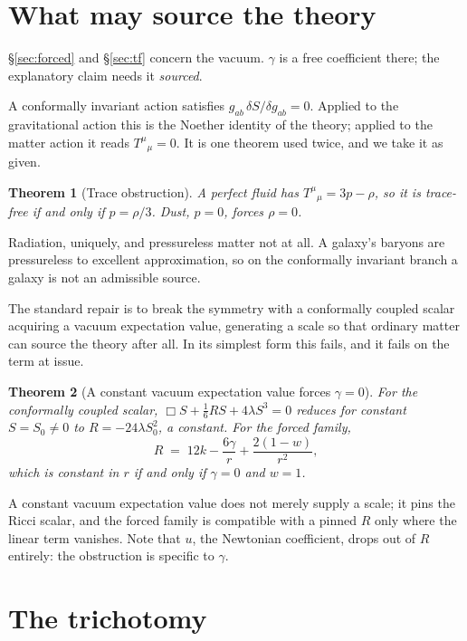 \documentclass[11pt]{article}
\newtheorem{theorem}{Theorem}[section]
\theoremstyle{definition}
\theoremstyle{remark}
\begin{document}
\section{What may source the theory}
\label{sec:matter}

\S\ref{sec:forced} and \S\ref{sec:tf} concern the vacuum.  \(\gamma\) is a
free coefficient there; the explanatory claim needs it \emph{sourced}.

A conformally invariant action satisfies
\(g_{ab}\,\delta S/\delta g_{ab}=0\).  Applied to the gravitational action
this is the Noether identity of the theory; applied to the matter action it
reads \(T^{\mu}{}_{\mu}=0\).  It is one theorem used twice, and we take it as
given.

\begin{theorem}[Trace obstruction]
\label{thm:trace}
A perfect fluid has \(T^{\mu}{}_{\mu}=3p-\rho\), so it is trace-free if and
only if \(p=\rho/3\).  Dust, \(p=0\), forces \(\rho=0\).
\end{theorem}

Radiation, uniquely, and pressureless matter not at all.  A galaxy's baryons
are pressureless to excellent approximation, so on the conformally invariant
branch a galaxy is not an admissible source.

The standard repair is to break the symmetry with a conformally coupled
scalar acquiring a vacuum expectation value, generating a scale so that
ordinary matter can source the theory after all.  In its simplest form this
fails, and it fails on the term at issue.

\begin{theorem}[A constant vacuum expectation value forces \(\gamma=0\)]
\label{thm:vev}
For the conformally coupled scalar, \(\Box S+\tfrac{1}{6}RS+4\lambda S^{3}=0\)
reduces for constant \(S=S_{0}\neq0\) to \(R=-24\lambda S_{0}^{2}\), a
constant.  For the forced family,
\[
  R \;=\; 12k-\frac{6\gamma}{r}+\frac{2(1-w)}{r^{2}},
\]
which is constant in \(r\) if and only if \(\gamma=0\) and \(w=1\).
\end{theorem}

A constant vacuum expectation value does not merely supply a scale; it pins
the Ricci scalar, and the forced family is compatible with a pinned \(R\)
only where the linear term vanishes.  Note that \(u\), the Newtonian
coefficient, drops out of \(R\) entirely: the obstruction is specific to
\(\gamma\).

\section{The trichotomy}
\label{sec:trichotomy}
\end{document}
